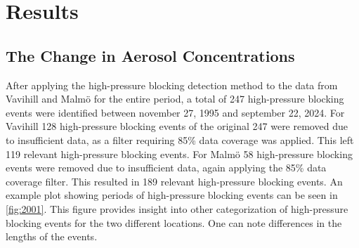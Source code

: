 \newpage
\section{Results}
\subsection{The Change in Aerosol Concentrations}
After applying the high-pressure blocking detection method to the data from Vavihill and Malmö for the entire period, a total of 247 high-pressure blocking events were identified between november 27, 1995 and september 22, 2024. For Vavihill 128 high-pressure blocking events of the original 247 were removed due to insufficient \PM data, as a filter requiring 85\% data coverage was applied. This left 119 relevant high-pressure blocking events. For Malmö 58 high-pressure blocking events were removed due to insufficient \PM data, again applying the 85\% data coverage filter. This resulted in 189 relevant high-pressure blocking events. An example plot showing periods of high-pressure blocking events can be seen in \autoref{fig:2001}. This figure provides insight into other categorization of high-pressure blocking events for the two different locations. One can note differences in the lengths of the events. 

